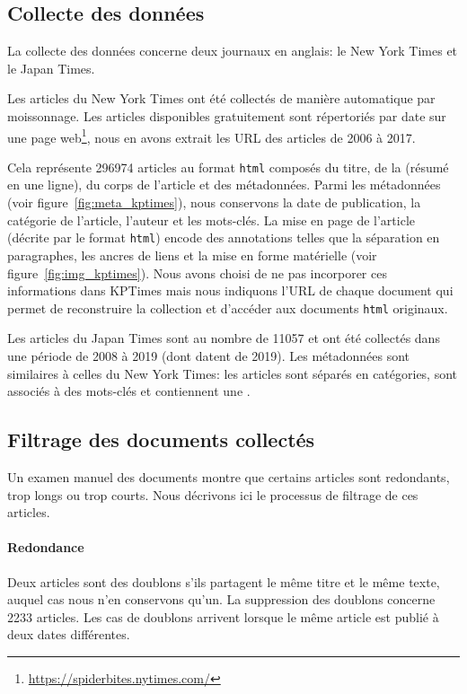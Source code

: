 \subsection{Collecte des données}

La collecte des données concerne deux journaux en anglais: le New York Times et le Japan Times.

Les articles du New York Times ont été collectés de manière automatique par moissonnage. Les articles disponibles gratuitement sont répertoriés par date sur une page web\footnote{\url{https://spiderbites.nytimes.com/}}, nous en avons extrait les URL des articles de 2006 à 2017.



Cela représente \num{296974} articles au format \texttt{html} composés du titre, de la  (résumé en une ligne), du corps de l'article et des métadonnées. Parmi les métadonnées (voir figure~\ref{fig:meta_kptimes}), nous conservons la date de publication, la catégorie de l'article, l'auteur et les mots-clés.
La mise en page de l'article (décrite par le format \texttt{html}) encode des annotations telles que la séparation en paragraphes, les ancres de liens et la mise en forme matérielle (voir figure~\ref{fig:img_kptimes}).
Nous avons choisi de ne pas incorporer ces informations dans KPTimes mais nous indiquons l'URL de chaque document qui permet de reconstruire la collection et d'accéder aux documents \texttt{html} originaux.

Les articles du Japan Times sont au nombre de  \num{11057} et ont été collectés dans une période de 2008 à 2019 (dont  datent de 2019). Les métadonnées sont similaires à celles du New York Times: les articles sont séparés en catégories, sont associés à des mots-clés et contiennent une . 

\subsection{Filtrage des documents collectés}\label{ssec:kptimes_filter}

Un examen manuel des documents montre que certains articles sont redondants, trop longs ou trop courts. Nous décrivons ici le processus de filtrage de ces articles.

\paragraph{Redondance}
Deux articles sont des doublons s'ils partagent le même titre et le même texte, auquel cas nous n'en conservons qu'un. La suppression des doublons concerne \num{2233} articles. Les cas de doublons arrivent lorsque le même article est publié à deux dates différentes.

